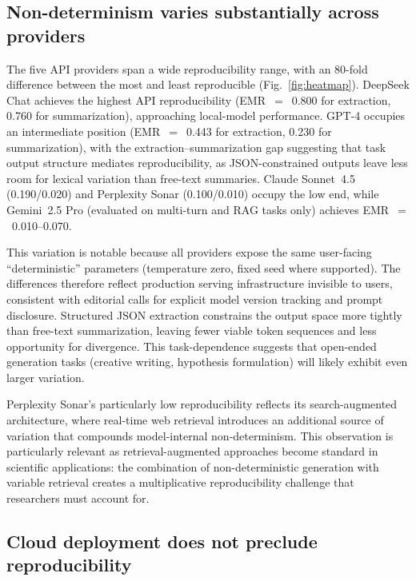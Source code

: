 \documentclass[sn-nature]{sn-jnl}
\begin{document}
\subsection{Non-determinism varies substantially across providers}\label{subsec:providers}

The five API providers span a wide reproducibility range, with an 80-fold difference between the most and least reproducible (Fig.~\ref{fig:heatmap}).
DeepSeek Chat achieves the highest API reproducibility (EMR~$=$~0.800 for extraction, 0.760 for summarization), approaching local-model performance.
GPT-4 occupies an intermediate position (EMR~$=$~0.443 for extraction, 0.230 for summarization), with the extraction--summarization gap suggesting that task output structure mediates reproducibility, as JSON-constrained outputs leave less room for lexical variation than free-text summaries.
Claude Sonnet~4.5 (0.190/0.020) and Perplexity Sonar (0.100/0.010) occupy the low end, while Gemini~2.5 Pro (evaluated on multi-turn and RAG tasks only) achieves EMR~$=$~0.010--0.070.

This variation is notable because all providers expose the same user-facing ``deterministic'' parameters (temperature zero, fixed seed where supported).
The differences therefore reflect production serving infrastructure invisible to users, consistent with editorial calls for explicit model version tracking and prompt disclosure\cite{editorial2024framework}.
Structured JSON extraction constrains the output space more tightly than free-text summarization, leaving fewer viable token sequences and less opportunity for divergence.
This task-dependence suggests that open-ended generation tasks (creative writing, hypothesis formulation) will likely exhibit even larger variation.

Perplexity Sonar's particularly low reproducibility reflects its search-augmented architecture, where real-time web retrieval introduces an additional source of variation that compounds model-internal non-determinism.
This observation is particularly relevant as retrieval-augmented approaches become standard in scientific applications: the combination of non-deterministic generation with variable retrieval creates a multiplicative reproducibility challenge that researchers must account for.


\subsection{Cloud deployment does not preclude reproducibility}\label{subsec:cloud}
\end{document}
